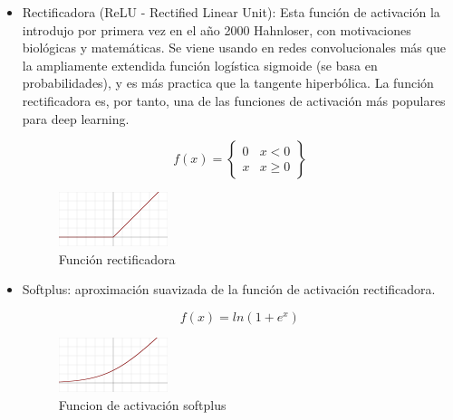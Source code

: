 \begin{itemize}
\item Rectificadora (ReLU - Rectified Linear Unit): Esta función de activación la introdujo por primera vez en el año 2000 Hahnloser, con motivaciones biológicas y matemáticas. Se viene usando en redes convolucionales más que la ampliamente extendida función logística sigmoide (se basa en probabilidades), y es más practica que la tangente hiperbólica. La función rectificadora es, por tanto, una de las funciones de activación más populares para deep learning.
\begin{figure}[H]
\centering
\begin{minipage}[b]{0.4\textwidth}
  \begin{equation}
    f(x) = \begin{Bmatrix}
    0 & x<0\\
    x & x\geq 0
    \end{Bmatrix}
  \end{equation}
  \end{minipage}
\hfill
\begin{minipage}[b]{0.4\textwidth}
  \includegraphics[scale=0.8]{images/Activation_rectified_linear.png}
  \caption{Función rectificadora}
\end{minipage}
\end{figure}

\item Softplus: aproximación suavizada de la función de activación rectificadora.
\begin{figure}[htp]
\centering
\begin{minipage}[b]{0.4\textwidth}
  \begin{equation}
  f(x) = ln(1+e^{x})
  \end{equation}
  \end{minipage}
\hfill
\begin{minipage}[b]{0.4\textwidth}
  \includegraphics[scale=0.8]{images/Activation_softplus.png}
  \caption{Funcion de activación softplus}
\end{minipage}
\end{figure}
\end{itemize}


